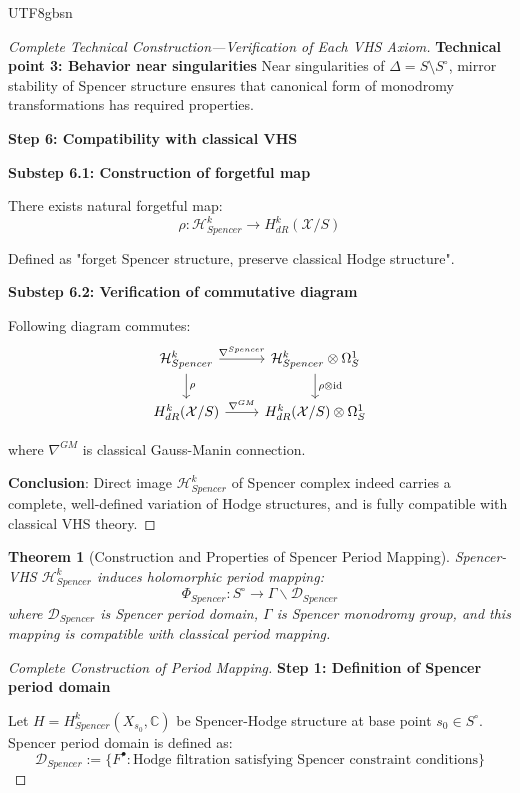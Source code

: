 \documentclass[a4paper,12pt]{extarticle}
\newtheorem{theorem}{Theorem}[section]
\theoremstyle{definition}
\begin{document}
\begin{CJK}{UTF8}{gbsn}
\begin{proof}[Complete Technical Construction—Verification of Each VHS Axiom]
\textbf{Technical point 3: Behavior near singularities}
Near singularities of $\Delta = S \setminus S^\circ$, mirror stability of Spencer structure ensures that canonical form of monodromy transformations has required properties.

\textbf{Step 6: Compatibility with classical VHS}

\textbf{Substep 6.1: Construction of forgetful map}

There exists natural forgetful map:
$$\rho: \mathcal{H}^k_{Spencer} \to H^k_{dR}(\mathcal{X}/S)$$

Defined as "forget Spencer structure, preserve classical Hodge structure".

\textbf{Substep 6.2: Verification of commutative diagram}

Following diagram commutes:
$$\begin{tikzcd}
\mathcal{H}^k_{Spencer} \arrow[r, "\nabla^{Spencer}"] \arrow[d, "\rho"] & 
\mathcal{H}^k_{Spencer} \otimes \Omega^1_S \arrow[d, "\rho \otimes \text{id}"] \\
H^k_{dR}(\mathcal{X}/S) \arrow[r, "\nabla^{GM}"] & 
H^k_{dR}(\mathcal{X}/S) \otimes \Omega^1_S
\end{tikzcd}$$

where $\nabla^{GM}$ is classical Gauss-Manin connection.

\textbf{Conclusion}: Direct image $\mathcal{H}^k_{Spencer}$ of Spencer complex indeed carries a complete, well-defined variation of Hodge structures, and is fully compatible with classical VHS theory.
\end{proof}

\begin{theorem}[Construction and Properties of Spencer Period Mapping]
\label{thm:spencer_period_map_complete}
Spencer-VHS $\mathcal{H}^k_{Spencer}$ induces holomorphic period mapping:
$$\Phi_{Spencer}: S^\circ \to \Gamma \backslash \mathcal{D}_{Spencer}$$
where $\mathcal{D}_{Spencer}$ is Spencer period domain, $\Gamma$ is Spencer monodromy group, and this mapping is compatible with classical period mapping.
\end{theorem}

\begin{proof}[Complete Construction of Period Mapping]
\textbf{Step 1: Definition of Spencer period domain}

Let $H = H^k_{Spencer}(X_{s_0}, \mathbb{C})$ be Spencer-Hodge structure at base point $s_0 \in S^\circ$. Spencer period domain is defined as:
$$\mathcal{D}_{Spencer} := \{F^{\bullet}: \text{Hodge filtration satisfying Spencer constraint conditions}\}$$


\end{proof}
\end{CJK}
\end{document}
